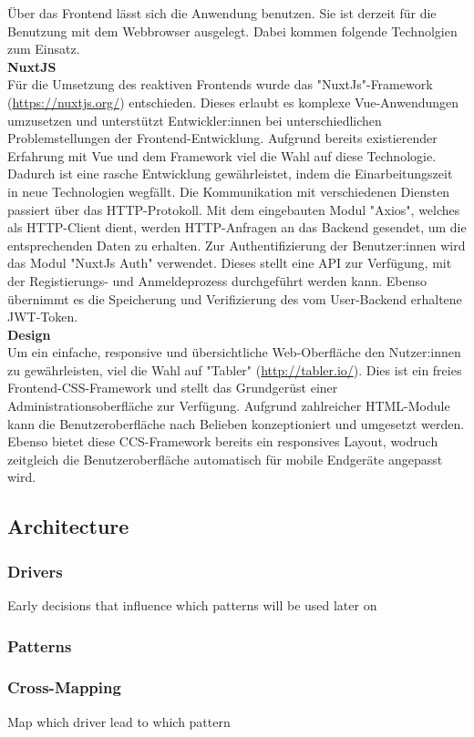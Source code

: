 Über das Frontend lässt sich die Anwendung benutzen. Sie ist derzeit für die Benutzung mit dem Webbrowser ausgelegt. Dabei kommen folgende Technolgien zum Einsatz.  \\

\textbf{NuxtJS} \\

Für die Umsetzung des reaktiven Frontends wurde das "NuxtJs"-Framework (\href{https://nuxtjs.org/}{https://nuxtjs.org/}) entschieden. Dieses erlaubt es komplexe Vue-Anwendungen umzusetzen und unterstützt Entwickler:innen
bei unterschiedlichen Problemstellungen der Frontend-Entwicklung. Aufgrund bereits existierender Erfahrung mit Vue und dem Framework viel die Wahl auf diese Technologie.
Dadurch ist eine rasche Entwicklung gewährleistet, indem die Einarbeitungszeit in neue Technologien wegfällt. Die Kommunikation mit verschiedenen Diensten passiert
über das HTTP-Protokoll. Mit dem eingebauten Modul "Axios", welches als HTTP-Client dient, werden HTTP-Anfragen an das Backend gesendet, um die entsprechenden Daten 
zu erhalten. Zur Authentifizierung der Benutzer:innen wird das Modul "NuxtJs Auth" verwendet. Dieses stellt eine API zur Verfügung, mit der Registierungs- und Anmeldeprozess durchgeführt werden kann.
Ebenso übernimmt es die Speicherung und Verifizierung des vom User-Backend erhaltene JWT-Token. \\

\textbf{Design} \\

Um ein einfache, responsive und übersichtliche Web-Oberfläche den Nutzer:innen zu gewährleisten, viel die Wahl auf "Tabler" (\href{http://tabler.io/}{http://tabler.io/}). Dies ist ein freies Frontend-CSS-Framework
und stellt das Grundgerüst einer Administrationsoberfläche zur Verfügung. Aufgrund zahlreicher HTML-Module kann die Benutzeroberfläche nach Belieben konzeptioniert und 
umgesetzt werden. Ebenso bietet diese CCS-Framework bereits ein responsives Layout, wodruch zeitgleich die Benutzeroberfläche automatisch für mobile Endgeräte angepasst wird.

\subsection{Architecture}
\subsubsection{Drivers}
Early decisions that influence which patterns will be used later on
\subsubsection{Patterns}
\subsubsection{Cross-Mapping}
Map which driver lead to which pattern